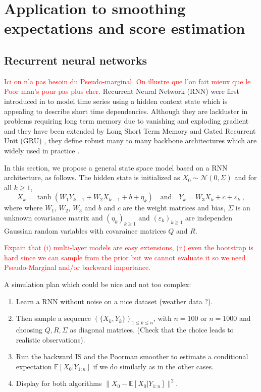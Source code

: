 \documentclass{article}
\newcommand{\eqsp}{\;}
\begin{document}
\section{Application to smoothing expectations and score estimation}
\label{sec:application}

\subsection{Recurrent neural networks}
\label{sec:simu:RNN}

\textcolor{red}{Ici on n'a pas besoin du Pseudo-marginal. On illustre que l'on fait mieux que le Poor man's pour pas plus cher.}
Recurrent Neural Network (RNN) were first introduced in \cite{Mozer1989AFB} to model time series using a hidden context state  which is appealing to describe short time dependencies. Although they are lackluster in problems requiring long term memory due to vanishing and exploding gradient \cite{Bengio1994LearningLD} and they have been extended by Long Short Term Memory  \cite{Hochreiter1997LongSM} and Gated Recurrent Unit (GRU) \cite{Cho2014LearningPR}, they define robust many to many backbone architectures which are widely used in practice \cite{}.


In this section, we propose a general state space model based on a RNN architecture, as follows.  The hidden state is initialized as $X_0 \sim \mathcal{N}(0,\Sigma)$ and for all $k\geqslant 1$,
$$
X_k = \tanh(W_{1} Y_{k-1} + W_{2} X_{k-1} + b + \eta_k)\quad\mathrm{and} \quad Y_k = W_{3} X_{k}  + c + \varepsilon_k\eqsp,
$$
where where $W_{1}$, $W_{2}$, $W_3$ and $b$ and $c$ are the weight matrices and bias,  $\Sigma$ is an unknown covariance matrix and $(\eta_k)_{k\geqslant 1}$ and $(\varepsilon_k)_{k\geqslant 1}$ are independen Gaussian random variables with covaraince matrices $Q$ and $R$.

\textcolor{red}{Expain that (i) multi-layer models  are easy extensions, (ii) even the bootstrap is hard since we can sample from the prior but we cannot evaluate it so we need Pseudo-Marginal and/or backward importance.}

A simulation plan which could be nice and not too complex:
\begin{enumerate}
\item Learn a RNN without noise on a nice dataset (weather data ?).
\item Then sample a sequence $(\{X_k,Y_k\})_{1\leqslant k\leqslant n}$, with $n=100$ or $n=1000$ and choosing $Q,R,\Sigma$ as diagonal matrices. (Check that the choice leads to realistic observations).
\item Run the backward IS and the Poorman smoother to estimate a conditional expectation $\mathbb{E}[X_0|Y_{1:n}]$ if we do similarly as in the other cases.
\item Display for both algorithms $\|X_0 - \mathbb{E}[X_0|Y_{1:n}]\|^2$.
\end{enumerate}
\end{document}
